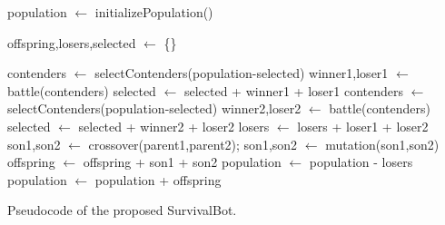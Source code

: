 \documentclass[conference]{IEEEtran}
\begin{document}
\begin{algorithm}[htb]
\begin{algorithmic}

\STATE population $\leftarrow$ initializePopulation()

  \STATE offspring,losers,selected $\leftarrow$ \{\}

    \STATE contenders $\leftarrow$ selectContenders(population-selected)
    \STATE winner1,loser1 $\leftarrow$ battle(contenders)
    \STATE selected $\leftarrow$ selected + winner1 + loser1
    \STATE contenders $\leftarrow$ selectContenders(population-selected)
    \STATE winner2,loser2 $\leftarrow$ battle(contenders)
    \STATE selected $\leftarrow$ selected + winner2 + loser2
    \STATE losers $\leftarrow$ losers + loser1 + loser2
    \STATE son1,son2 $\leftarrow$ crossover(parent1,parent2);
    \STATE son1,son2 $\leftarrow$ mutation(son1,son2)
    \STATE offspring $\leftarrow$ offspring + son1 + son2
    \STATE population $\leftarrow$ population - losers
    \STATE population $\leftarrow$ population + offspring

\ENDWHILE

\end{algorithmic}
\caption{Pseudocode of the proposed SurvivalBot.}
\label{alg:completealgorithm}
\end{algorithm}
\end{document}
